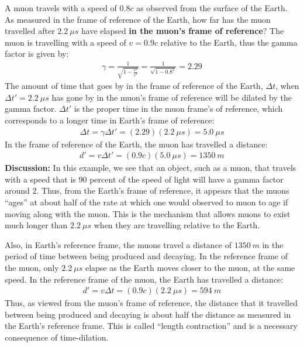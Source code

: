 \begin{example}{A muon travels with a speed of $0.8c$ as observed from the surface of the Earth. As measured in the frame of reference of the Earth, how far has the muon travelled after $\SI{2.2}{\mu s}$ have elapsed \textbf{in the muon's frame of reference}?}
The muon is travelling with a speed of $v=0.9c$ relative to the Earth, thus the gamma factor is given by:
\begin{align*}
\gamma = \frac{1}{\sqrt{1-\frac{v^2}{c^2}}} =\frac{1}{\sqrt{1-0.8^2}}=2.29
\end{align*}
The amount of time that goes by in the frame of reference of the Earth, $\Delta t$, when $\Delta t'=\SI{2.2}{\mu s}$ has gone by in the muon's frame of reference will be dilated by the gamma factor. $\Delta t'$ is the proper time in the muon frame's of reference, which corresponds to a longer time in Earth's frame of reference:
\begin{align*}
\Delta t = \gamma \Delta t' = (2.29)(\SI{2.2}{\mu s})=\SI{5.0}{\mu s}
\end{align*}
In the frame of reference of the Earth, the muon has travelled a distance:
\begin{align*}
d' = v\Delta t'=(0.9c)(\SI{5.0}{\mu s})=\SI{1350}{m}
\end{align*}
\textbf{Discussion: }In this example, we see that an object, such as a muon, that travels with a speed that is 90 percent of the speed of light will have a gamma factor around 2. Thus, from the Earth's frame of reference, it appears that the muons ``ages'' at about half of the rate at which one would observed to muon to age if moving along with the muon. This is the mechanism that allows muons to exist much longer than $\SI{2.2}{\mu s}$ when they are travelling relative to the Earth.

Also, in Earth's reference frame, the muons travel a distance of $\SI{1350}{m}$ in the period of time between being produced and decaying. In the reference frame of the muon, only $\SI{2.2}{\mu s}$ elapse as the Earth moves closer to the muon, at the same speed. In the reference frame of the muon, the Earth has travelled a distance:
\begin{align*}
d' = v\Delta t=(0.9c)(\SI{2.2}{\mu s})=\SI{594}{m}
\end{align*}
Thus, as viewed from the muon's frame of reference, the distance that it travelled between being produced and decaying is about half the distance as measured in the Earth's reference frame. This is called ``length contraction'' and is a necessary consequence of time-dilation. 
\end{example}

